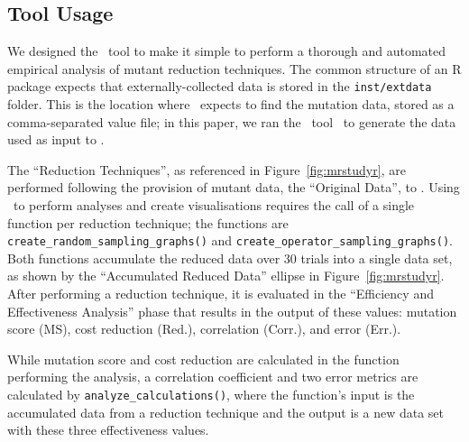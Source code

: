 \subsection{Tool Usage}




We designed the \mr~tool to make it simple to perform a thorough and automated empirical analysis of mutant reduction
techniques. The common structure of an R package expects that externally-collected data is stored in the
\texttt{inst/extdata} folder. This is the location where \mr~expects to find the mutation data, stored as a
comma-separated value file; in this paper, we ran the \sa~tool~\cite{McMinn2016} to generate the data used as input
to \mr.




The ``Reduction Techniques'', as referenced in Figure~\ref{fig:mrstudyr}, are performed following the provision of
mutant data, the ``Original Data'', to \mr. Using \mr~to perform analyses and create visualisations requires the call of
a single function  per reduction technique; the functions are {\texttt{create\_random\_sampling\_graphs()}} and
{\texttt{create\_operator\_sampling\_graphs()}}. Both functions accumulate the reduced data over 30 trials into a single
data set, as shown by the ``Accumulated Reduced Data'' ellipse in Figure~\ref{fig:mrstudyr}.  After performing a
reduction technique, it is evaluated in the ``Efficiency and Effectiveness Analysis'' phase that results in the output
of these values: mutation score (MS), cost reduction (Red.), correlation (Corr.), and error (Err.).


While mutation score and cost reduction are calculated in the function performing the analysis, a correlation
coefficient and two error metrics are calculated by \texttt{analyze\_calculations()}, where the function's input is the
accumulated data from a reduction technique and the output is a new data set with these three effectiveness
values.

